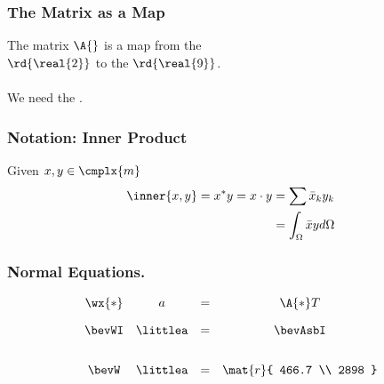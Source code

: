 %
%
\begin{frame}\frametitle{The Matrix as a Map}
	The matrix $\A{}$ is a map from the \\  $\rd{\real{2}}$ to the  $\rd{\real{9}}$. \\ 
	\pause
	\ \\
	We need the .
\end{frame}
%
%
%
\begin{frame}\frametitle{Notation: Inner Product}
Given $x, y \in \cmplx{m}$
\begin{equation}
\begin{split}
	\inner{x, y} = x^{*}y = x \cdot y 
		&= \sum \bar{x}_{k}y_{k} \\
		&= \int_{\Omega} \bar{x} y d\Omega
\end{split}
\end{equation}
\end{frame}
%
\begin{frame}\frametitle{Normal Equations.}
\begin{equation}
	\begin{array}{ccccc cccc}
		 \wx{*} & a & = & \A{*}T \\[10pt]
		\bevWI & \littlea & = & \bevAsbI\\[20pt]
		\bevW & \littlea & = & \mat{r}{ 466.7 \\ 2898 } \\
	\end{array}
\label{eq:bevington normal equations problem and solution}
\end{equation}
\end{frame}
%
%
